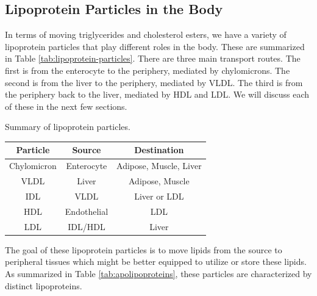 \documentclass{tufte-handout}
\begin{document}
\subsection{Lipoprotein Particles in the Body}

In terms of moving triglycerides and cholesterol esters, we have a variety of lipoprotein particles that play different roles in the body.  These are summarized in Table \ref{tab:lipoprotein-particles}.  There are three main transport routes.  The first is from the enterocyte to the periphery, mediated by chylomicrons.  The second is from the liver to the periphery, mediated by VLDL.  The third is from the periphery back to the liver, mediated by HDL and LDL.  We will discuss each of these in the next few sections.

\begin{margintable}
\centering
\caption{Summary of lipoprotein particles.}
\label{tab:lipoprotein-particles}
\begin{tabular}{@{}ccc@{}}
\toprule
\textbf{Particle} & \textbf{Source} & \textbf{Destination}       \\ \midrule
Chylomicron       & Enterocyte      & Adipose, Muscle, Liver \\
VLDL              & Liver           & Adipose, Muscle            \\
IDL               & VLDL          & Liver or LDL \\
HDL               & Endothelial     & LDL                        \\
LDL               & IDL/HDL             & Liver                      \\ \bottomrule
\end{tabular}
\end{margintable}


The goal of these lipoprotein particles is to move lipids from the source to peripheral tissues which might be better equipped to utilize or store these lipids.  As summarized in Table \ref{tab:apolipoproteins}, these particles are characterized by distinct lipoproteins.
\end{document}
